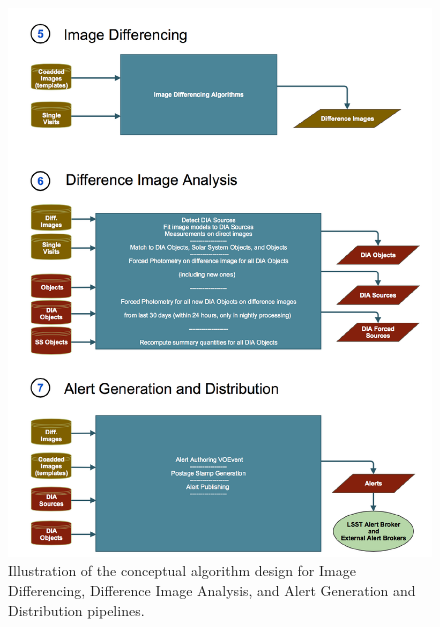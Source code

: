 \documentclass[SE,lsstdraft,toc]{lsstdoc}
\begin{document}
\begin{figure}[!th]
    \centering
    \vskip -0.3in
    \includegraphics[scale=0.555, angle=0]{gliffy/DifferenceImageProcessing}
    \vskip -0.1in
    \caption{Illustration of the conceptual algorithm  design for Image Differencing, Difference Image
                      Analysis, and Alert Generation and Distribution pipelines. \label{fig:Pipes567}}
\end{figure}
\end{document}
